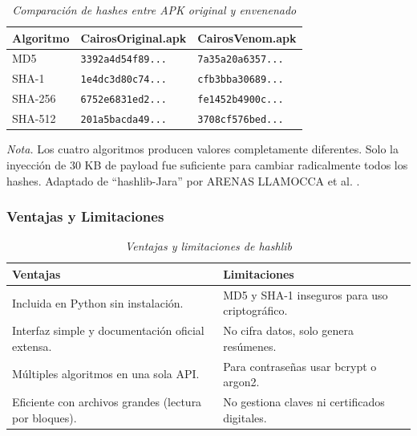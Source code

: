 \documentclass[12pt,a4paper]{article}
\begin{document}
\begin{table}[H]
\centering
\begin{threeparttable}
\caption{\textit{Comparación de hashes entre APK original y envenenado}}
\label{tab:hashes_apk}
\begin{tabular}{p{1.8cm}p{5.3cm}p{5.3cm}}
\toprule
\textbf{Algoritmo} & \textbf{CairosOriginal.apk} & \textbf{CairosVenom.apk} \\
\midrule
MD5 & \texttt{3392a4d54f89...} & \texttt{7a35a20a6357...} \\
SHA-1 & \texttt{1e4dc3d80c74...} & \texttt{cfb3bba30689...} \\
SHA-256 & \texttt{6752e6831ed2...} & \texttt{fe1452b4900c...} \\
SHA-512 & \texttt{201a5bacda49...} & \texttt{3708cf576bed...} \\
\bottomrule
\end{tabular}
\begin{tablenotes}
\item \textit{Nota.} Los cuatro algoritmos producen valores completamente diferentes. Solo la inyección de 30 KB de payload fue suficiente para cambiar radicalmente todos los hashes. Adaptado de \enquote{hashlib-Jara} por ARENAS LLAMOCCA et al. \cite{huacac2026}.
\end{tablenotes}
\end{threeparttable}
\end{table}

\subsubsection{Ventajas y Limitaciones}

\begin{table}[H]
\centering
\begin{threeparttable}
\caption{\textit{Ventajas y limitaciones de hashlib}}
\begin{tabular}{p{6.5cm}p{6.5cm}}
\toprule
\textbf{Ventajas} & \textbf{Limitaciones} \\
\midrule
Incluida en Python sin instalación. & MD5 y SHA-1 inseguros para uso criptográfico. \\
Interfaz simple y documentación oficial extensa. & No cifra datos, solo genera resúmenes. \\
Múltiples algoritmos en una sola API. & Para contraseñas usar bcrypt o argon2. \\
Eficiente con archivos grandes (lectura por bloques). & No gestiona claves ni certificados digitales. \\
\bottomrule
\end{tabular}
\end{threeparttable}
\end{table}
\end{document}
